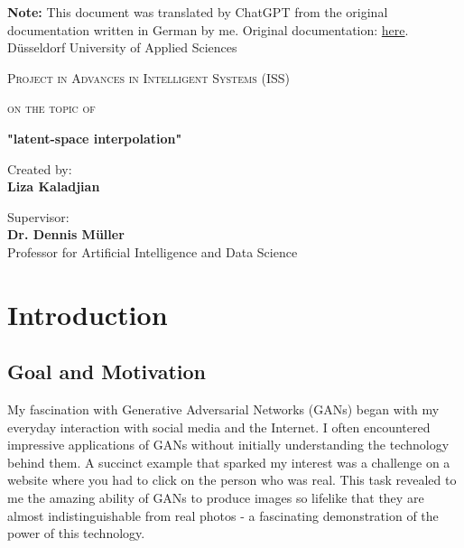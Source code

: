 \documentclass[a4paper, 12pt]{article}
\title{\haThema}
\author{\haAutor}
\date{\today}
\newcommand{\haThema}{"latent-space interpolation"}
\newcommand{\haAutor}{Liza Kaladjian}
\newcommand{\haDeckblattTextEins}{Project in Advances in Intelligent Systems (ISS)}
\newcommand{\haGutachter}{Dr. Dennis Müller}
\newcommand{\haGutachterText}{Professor for Artificial Intelligence and Data Science}
\begin{document}
\begin{titlepage}
\noindent
\textbf{Note:} This document was translated by ChatGPT from the original documentation written in German by me.  Original documentation: \href{https://github.com/Lizoug/FaceFusion-Videos-from-Latent-Interpolations/blob/main/German_Documentation/Dokumentation.pdf}{here}.\\
Düsseldorf University of Applied Sciences \\
\begin{center}
\vspace{1.5cm}
{\scshape\large \haDeckblattTextEins \par}
\vspace{1cm}
{\scshape\large on the topic of\par}
\vspace{1.5cm}
{\LARGE\bfseries \haThema \par}
\vfill
{Created by:\\ {\bfseries \haAutor} \par}
\vspace{1cm}
\vspace{1cm}
Supervisor:\\ {\bfseries \haGutachter}\\ \haGutachterText
\vfill
\end{center}
\end{titlepage}
\thispagestyle{empty}
\newpage

\tableofcontents
\thispagestyle{empty}
\newpage

\setcounter{page}{1}

\section{Introduction}
\subsection{Goal and Motivation}
My fascination with Generative Adversarial Networks (GANs) began with my everyday interaction with social media and the Internet. I often encountered impressive applications of GANs without initially understanding the technology behind them. A succinct example that sparked my interest was a challenge on a website where you had to click on the person who was real. This task revealed to me the amazing ability of GANs to produce images so lifelike that they are almost indistinguishable from real photos - a fascinating demonstration of the power of this technology.
\end{document}
